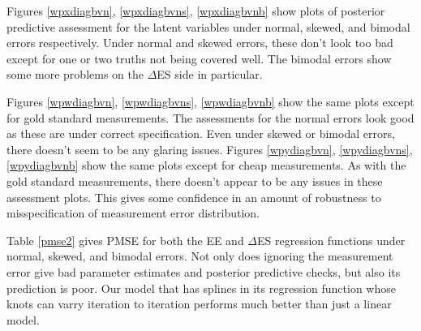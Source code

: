 \documentclass[11pt]{article}\usepackage[]{graphicx}\usepackage[]{color}
\begin{document}
Figures \ref{wpxdiagbvn}, \ref{wpxdiagbvns}, \ref{wpxdiagbvnb} show plots of posterior predictive assessment for the latent variables under normal, skewed, and bimodal errors respectively. Under normal and skewed errors, these don't look too bad except for one or two truths not being covered well. The bimodal errors show some more problems on the $\Delta$ES side in particular. 

Figures \ref{wpwdiagbvn}, \ref{wpwdiagbvns}, \ref{wpwdiagbvnb} show the same plots except for gold standard measurements. The assessments for the normal errors look good as  these are under correct specification. Even under skewed or bimodal errors, there doesn't seem to be any glaring issues. Figures \ref{wpydiagbvn}, \ref{wpydiagbvns}, \ref{wpydiagbvnb} show the same plots except for cheap measurements. As with the gold standard measurements, there doesn't appear to be any issues in these assessment plots. This gives some confidence in an amount of robustness to misspecification of measurement error distribution.


Table \ref{pmse2} gives PMSE for both the EE and $\Delta$ES regression functions under normal, skewed, and bimodal errors. Not only does ignoring the measurement error give bad parameter estimates and posterior predictive checks, but also its prediction is poor. Our model that has splines in its regression function  whose knots can varry iteration to iteration performs much better than just a linear model. 
\end{document}
